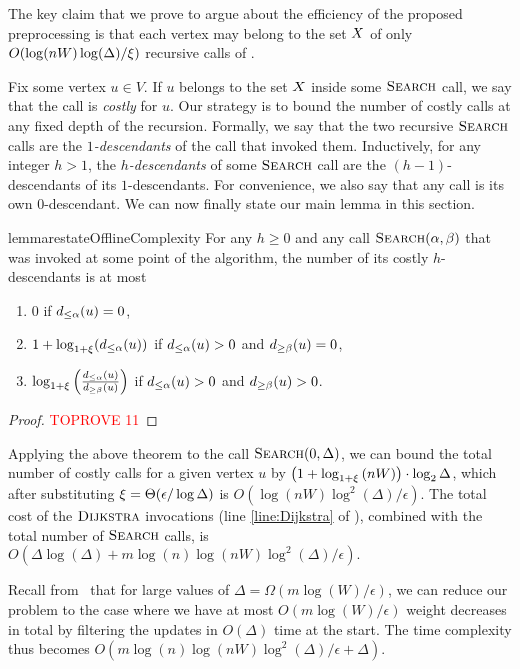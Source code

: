 \documentclass[11pt,letterpaper]{article}
\theoremstyle{plain}
\renewcommand{\O}{O}
\newcommand{\eps}{\ensuremath{\epsilon}}
\begin{document}
The key claim that we prove to argue about the efficiency of the proposed preprocessing is that each vertex may belong to the set $X$ of only $\O(\log(nW) \log(\Delta) / \epsp)$ recursive calls of .

Fix some vertex $u\in V$.
If $u$ belongs to the set $X$ inside some $\textproc{Search}$ call, we say that the call is \emph{costly} for $u$.
Our strategy is to bound the number of costly calls at any fixed depth of the recursion.
Formally, we say that the two recursive $\textproc{Search}$ calls are the \emph{$1$-descendants} of the call that invoked them.
Inductively, for any integer $h > 1$, the \emph{$h$-descendants} of some $\textproc{Search}$ call are the $(h - 1)$-descendants of its $1$-descendants.
For convenience, we also say that any call is its own $0$-descendant.
We can now finally state our main lemma in this section.

\begin{restatable}[]{lemma}{restateOfflineComplexity}
	For any $h \ge 0$ and any call $\textproc{Search}(\alpha, \beta)$ that was invoked at some point of the algorithm, the number of its costly $h$-descendants is at most
  \begin{enumerate}[label=${\arabic*}^\circ)$,ref=${\arabic*}^\circ$]
		\item $0$ if $d_{\le\alpha}(u) = 0$, \label{case:1}
    \item $1 + \log_{1 + \xi}(d_{\le\alpha}(u))$ if $d_{\le\alpha}(u) > 0$ and $d_{\ge\beta}(u) = 0$, \label{case:2}
    \item $\log_{1 + \xi}\left(\frac{d_{\le\alpha}(u)}{d_{\ge\beta}(u)}\right)$ if $d_{\le\alpha}(u) > 0$ and $d_{\ge\beta}(u) > 0$. \label{case:3}
	\end{enumerate}
\end{restatable}
\begin{proof}\textcolor{red}{TOPROVE 11}\end{proof}

Applying the above theorem to the call $\textproc{Search}(0, \Delta)$, we can bound the total number of costly calls for a given vertex $u$ by
$\left(1 + \log_{1 + \xi}\left(nW\right)\right) \cdot \log_2 \Delta$, which after substituting 
$\epsp=\Theta(\eps/\log\Delta)$ is 
$\O(\log(nW) \log^2(\Delta) / \eps)$.
The total cost of the $\textproc{Dijkstra}$ invocations (line \ref{line:Dijkstra} of ), combined with the total number of $\textproc{Search}$ calls, is
$\O(\Delta \log(\Delta) + m \log(n)\log(nW) \log^2(\Delta) / \eps).$

Recall from~ that for large values of $\Delta = \Omega(m \log(W)/\eps)$, we can reduce our problem to the case where we have at most $\O(m \log(W)/\eps)$ weight decreases in total by filtering the updates in $\O(\Delta)$ time at the start.
The time complexity thus becomes
$\O(m \log(n)\log(nW)\log^2(\Delta) / \eps + \Delta)$.
\end{document}
